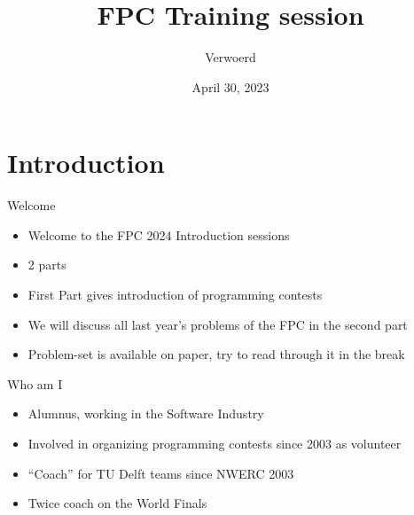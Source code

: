 \documentclass[11pt,pdf, aspectratio=169]{beamer}
\title{FPC Training session}
\author{Verwoerd}
\date{April 30, 2023}
\begin{document}
  \section{Introduction}
  \begin{frame}{Welcome}
    \begin{itemize}
      \item Welcome to the FPC 2024 Introduction sessions
      \item 2 parts
      \item First Part gives introduction of programming contests
      \item We will discuss all last year's problems of the FPC in the second part
      \item Problem-set is available on paper, try to read through it in the break
    \end{itemize}
  \end{frame}
  \begin{frame}{Who am I}
    \begin{itemize}
      \item Alumnus, working in the Software Industry
      \item Involved in organizing programming contests since 2003 as volunteer
      \item ``Coach'' for TU Delft teams since NWERC 2003
      \item Twice coach on the World Finals
    \end{itemize}
    \doclicenseThis
  \end{frame}
\end{document}
